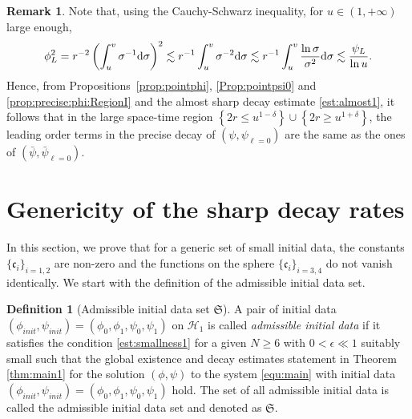 \documentclass[a4paper,reqno]{amsart}
\theoremstyle{definition}
\newtheorem{definition}[theorem]{Definition}
\newtheorem{remark}[theorem]{Remark}
\numberwithin{equation}{section}
\def \d {{\rm{d}}}
\def\cfrak{\mathfrak{c}}
\def\phiinit{\phi_{init}}
\def\psiinit{\psi_{init}}
\def\ep{\epsilon}
\def\Sfrak{\mathfrak{S}}
\begin{document}
\begin{remark}\label{re:region12}
Note that, using the Cauchy-Schwarz inequality, for $u\in (1,+\infty)$ large enough,
 \begin{equation}\label{est:phiLpsiL}
\begin{aligned}
    \phi_{L}^{2}=r^{-2}\left(\int_{u}^{v}\sigma^{-1}\d \sigma\right)^{2}
    \lesssim r^{-1}\int_{u}^{v}\sigma^{-2}\d \sigma\lesssim r^{-1}\int_{u}^v \frac{\ln \sigma }{\sigma^2} \d \sigma\lesssim 
    \frac{\psi_{L}}{\ln u}.
\end{aligned}
\end{equation}
Hence, from Propositions~\ref{prop:pointphi}, \ref{Prop:pointpsi0} and \ref{prop:precise:phi:RegionI} and the almost sharp decay estimate \eqref{est:almost1}, it follows that in the large space-time region $\left\{2r\le u^{1-\delta}\right\}\cup\left\{2r\ge u^{1+\delta}\right\}$, the leading order terms in the precise decay of $(\psi,\psi_{\ell=0})$ are the same as the ones of $(\bar{\psi},\bar{\psi}_{\ell=0})$.
\end{remark}





\section{Genericity of the sharp decay rates}\label{sec:generic}

In this section, we prove that for a generic set of small initial data, the constants $\{\cfrak_{i}\}_{i=1,2}$ are non-zero and the functions on the sphere $\{\cfrak_i\}_{i=3,4}$ do not vanish identically. We start with the definition of the admissible initial data set. 

\begin{definition}[Admissible initial data set $\Sfrak$]
\label{def:admissibledata}
A pair of initial data $(\phiinit,\psiinit)=(\phi_0,\phi_1,\psi_0,\psi_1)$ on $\mathcal{H}_1$ is called  \textit{admissible initial data} if it satisfies the condition \eqref{est:smallness1} for a given $N\geq 6$ with $0<\ep\ll 1$ suitably small such that the global existence and decay estimates statement in Theorem \ref{thm:main1} for the solution $(\phi,\psi)$ to the system \eqref{equ:main} with initial data $(\phiinit,\psiinit)=(\phi_0,\phi_1,\psi_0,\psi_1)$  hold.
The set of all admissible initial data is called the admissible initial data set and denoted as $\Sfrak$.
\end{definition}
\end{document}
